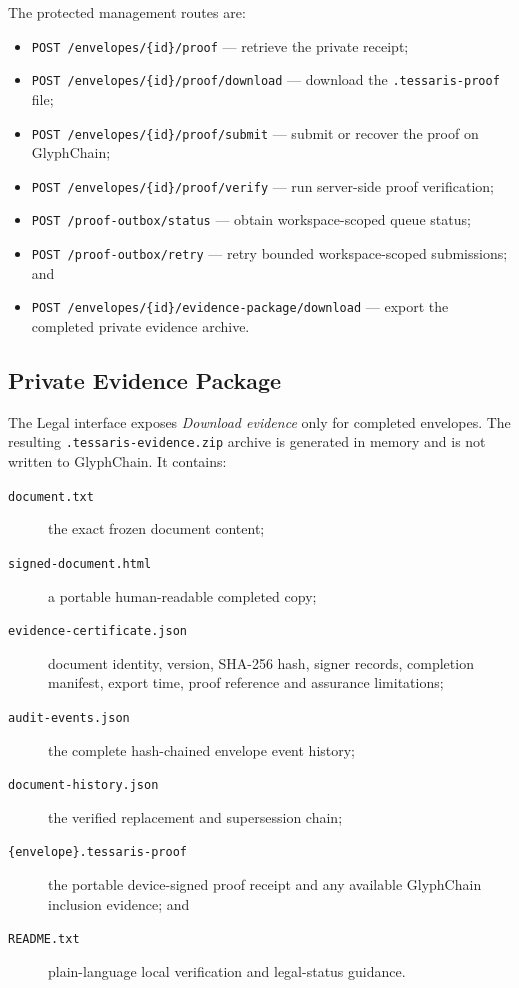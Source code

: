 The protected management routes are:

\begin{itemize}
  \item \texttt{POST /envelopes/\{id\}/proof} --- retrieve the private receipt;
  \item \texttt{POST /envelopes/\{id\}/proof/download} --- download the
        \texttt{.tessaris-proof} file;
  \item \texttt{POST /envelopes/\{id\}/proof/submit} --- submit or recover the
        proof on GlyphChain;
  \item \texttt{POST /envelopes/\{id\}/proof/verify} --- run server-side proof
        verification;
  \item \texttt{POST /proof-outbox/status} --- obtain workspace-scoped queue
        status;
  \item \texttt{POST /proof-outbox/retry} --- retry bounded workspace-scoped
        submissions; and
  \item \texttt{POST /envelopes/\{id\}/evidence-package/download} --- export the
        completed private evidence archive.
\end{itemize}

\subsection{Private Evidence Package}

The Legal interface exposes \emph{Download evidence} only for completed
envelopes.  The resulting \texttt{.tessaris-evidence.zip} archive is generated
in memory and is not written to GlyphChain.  It contains:

\begin{description}
  \item[\texttt{document.txt}] the exact frozen document content;
  \item[\texttt{signed-document.html}] a portable human-readable completed copy;
  \item[\texttt{evidence-certificate.json}] document identity, version, SHA-256
        hash, signer records, completion manifest, export time, proof reference
        and assurance limitations;
  \item[\texttt{audit-events.json}] the complete hash-chained envelope event
        history;
  \item[\texttt{document-history.json}] the verified replacement and
        supersession chain;
  \item[\texttt{\{envelope\}.tessaris-proof}] the portable device-signed proof
        receipt and any available GlyphChain inclusion evidence; and
  \item[\texttt{README.txt}] plain-language local verification and legal-status
        guidance.
\end{description}

